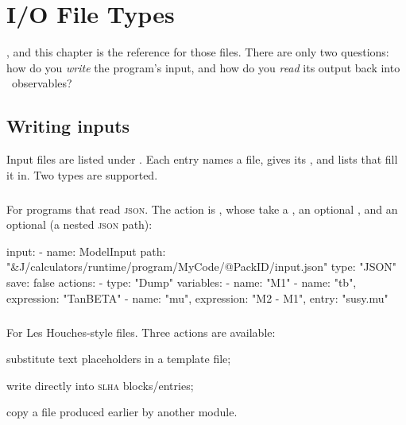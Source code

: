 \chapter{I/O File Types}
\label{ch:io-types}

, and this chapter is the reference
for those files. There are only two questions: how do you \emph{write} the program's input, and
how do you \emph{read} its output back into \Jarvis\ observables?

\section{Writing inputs}
\label{sec:io-input}

Input files are listed under . Each entry names a file, gives its
, and lists  that fill it in. Two types are supported.

\paragraph{} For programs that read \textsc{json}. The action is ,
whose  take a , an optional , and an
optional  (a nested \textsc{json} path):

\begin{yamlwin}
input:
  - name: ModelInput
    path: "&J/calculators/runtime/program/MyCode/@PackID/input.json"
    type: "JSON"
    save: false
    actions:
      - type: "Dump"
        variables:
          - {name: "M1"}
          - {name: "tb", expression: "TanBETA"}
          - {name: "mu", expression: "M2 - M1", entry: "susy.mu"}
\end{yamlwin}

\paragraph{} For Les Houches-style files. Three actions are available:

\begin{description}[style=nextline, leftmargin=1.2em]
  \item[\yamlkey{Replace}] substitute text placeholders in a template file;
  \item[\yamlkey{SLHA}] write directly into \textsc{slha} blocks/entries;
  \item[\yamlkey{File}] copy a file produced earlier by another module.
\end{description}

